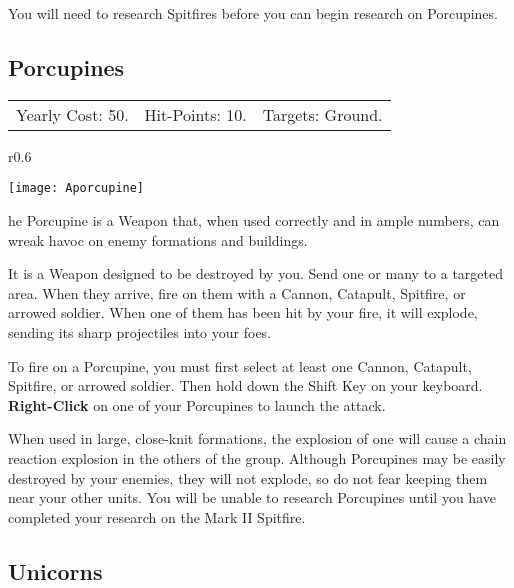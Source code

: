 You will need to research Spitfires before you can begin research on Porcupines.

\clearpage  %

\subsection{\textsf{Porcupines}}


\begin{tabular}{p{1.264in} p{1.264in} p{1.264in}}
Yearly Cost: 50. & Hit-Points: 10. & Targets: Ground.
\end{tabular}

\begin{wrapfigure}{r}{0.6\textwidth}
    \vspace{-20pt}
    \begin{center}
        \texttt{[image: Aporcupine]} %
    \end{center}
    \vspace{-20pt}
\end{wrapfigure}

he Porcupine is a Weapon that, when used correctly and in ample numbers, can wreak havoc on enemy formations and buildings.

It is a Weapon designed to be destroyed by you. Send one or many to a targeted area. When they arrive, fire on them with a Cannon, Catapult, Spitfire, or arrowed soldier. When one of them has been hit by your fire, it will explode, sending its sharp projectiles into your foes.

To fire on a Porcupine, you must first select at least one Cannon, Catapult, Spitfire, or arrowed soldier. Then hold down the Shift Key on your keyboard. \textbf{Right-Click} on one of your Porcupines to launch the attack.

When used in large, close-knit formations, the explosion of one will cause a chain reaction explosion in the others of the group. Although Porcupines may be easily destroyed by your enemies, they will not explode, so do not fear keeping them near your other units. You will be unable to research Porcupines until you have completed your research on the Mark II Spitfire.

\clearpage  %

\subsection{\textsf{Unicorns}}

